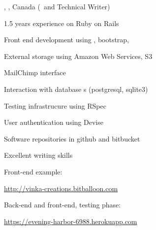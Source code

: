 \textbf{\large \current}

{\jobt{\consultant}, \nameMontreal, Canada (\webdev\ and Technical
Writer)

\begin{list}{} {\leftmargin=-1cm \itemsep-3pt} 
\vspace*{-0.2cm}
\item 1.5 years experience on Ruby on Rails
\item Front end development using , bootstrap, 
\item External storage using Amazon Web Services, S3
\item MailChimp interface
\item Interaction with database s (postgresql, sqlite3)
\item Testing infrastrucure using RSpec
\item User authentication using Devise
\item Software repositories in github and bitbucket
\item Excellent writing skills

Front-end example:
   \begin{list}{} {\leftmargin=0.5cm \itemsep-1pt} 
     \vspace*{-0.2cm}
     \item
     \href{http://vinka-creations.bitballoon.com}%
       {\footnotesize{\url{http://vinka-creations.bitballoon.com}}}
   \end{list}
Back-end and front-end, testing phase:
   \begin{list}{} {\leftmargin=0.5cm \itemsep-1pt} 
     \vspace*{-0.2cm}
     \item
     \href{https://evening-harbor-6988.herokuapp.com}%
       {\footnotesize{\url{https://evening-harbor-6988.herokuapp.com}}}
   \end{list}
\end{list}



\iffalse
\vspace*{-0.3cm}
   \begin{list}{\labelitemii} {\leftmargin=0.5cm \itemsep-1pt} 

   \item \webdevA.
     {\footnotesize{\url{https://evening-harbor-6988.herokuapp.com}}}
   \item \webdevB:\\
   \href{http://vinka-creations.bitballoon.com}%
     {\footnotesize{\url{http://vinka-creations.bitballoon.com}}}\\
   \end{list}

\vspace*{-0.2cm}
\item \nameWriter: \writerDesc.
\fi

}
